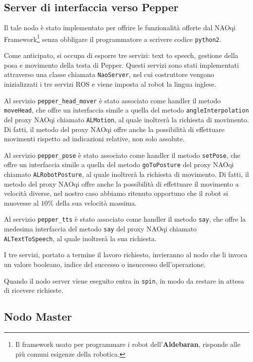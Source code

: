 \subsection{Server di interfaccia verso Pepper}

Il tale nodo è stato implementato per offrire le funzionalità offerte dal NAOqi Framework\footnote{Il framework usato per programmare i robot dell'\textbf{Aldebaran}, risponde alle più comuni esigenze della robotica.} senza obbligare il programmatore a scrivere codice \verb|python2|.

Come anticipato, si occupa di esporre tre servizi: text to speech, gestione della posa e movimento della testa di Pepper. 
Questi servizi sono stati implementati attraverso una classe chiamata \verb|NaoServer|, nel cui costruttore vengono inizializzati i tre servizi ROS e viene imposta al robot la lingua inglese.

Al servizio \verb|pepper_head_mover| è stato associato come handler il metodo \verb|moveHead|, che offre un interfaccia simile a quella del metodo \verb|angleInterpolation| del proxy NAOqi chiamato \verb|ALMotion|, al quale inoltrerà la richiesta di movimento. Di fatti, il metodo del proxy NAOqi offre anche la possibilità di effettuare movimenti rispetto ad indicazioni relative, non solo assolute.

Al servizio \verb|pepper_pose| è stato associato come handler il metodo \verb|setPose|, che offre un interfaccia simile a quella del metodo \verb|goToPosture| del proxy NAOqi chiamato \verb|ALRobotPosture|, al quale inoltrerà la richiesta di movimento. Di fatti, il metodo del proxy NAOqi offre anche la possibilità di effettuare il movimento a velocità diverse, nel nostro caso abbiamo ritenuto opportuno che il robot si muovesse al $10\%$ della sua velocità massima.

Al servizio \verb|pepper_tts| è stato associato come handler il metodo \verb|say|, che offre la medesima interfaccia del metodo \verb|say| del proxy NAOqi chiamato \verb|ALTextToSpeech|, al quale inoltrerà la sua richiesta.

I tre servizi, portato a termine il lavoro richiesto, invieranno al nodo che li invoca un valore booleano, indice del successo o insuccesso dell'operazione.

Quando il nodo server viene eseguito entra in \verb|spin|, in modo da restare in attesa di ricevere richieste.

\subsection{Nodo Master}

